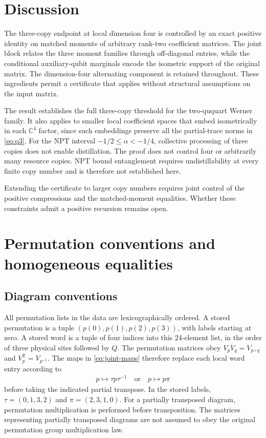 \documentclass[aps,pra,reprint,superscriptaddress,amsmath,amssymb,floatfix,nofootinbib]{revtex4-2}
\newcommand{\C}{\mathbb C}
\begin{document}
\section{Discussion}
\label{sec:discussion}

The three-copy endpoint at local dimension four is controlled by an
exact positive identity on matched moments of arbitrary rank-two
coefficient matrices. The joint block relates the three moment families
through off-diagonal entries, while the conditional auxiliary-qubit
marginals encode the isometric support of the original matrix.
The dimension-four alternating component is retained throughout.
These ingredients permit a certificate that applies without structural
assumptions on the input matrix.

The result establishes the full three-copy threshold for the two-ququart
Werner family. It also applies to smaller local coefficient spaces that
embed isometrically in each $\C^4$ factor, since such embeddings preserve
all the partial-trace norms in \cref{eq:q3}.
For the NPT interval $-1/2\leq\alpha<-1/4$, collective processing of
three copies does not enable distillation.
The proof does not control four or arbitrarily many resource copies.
NPT bound entanglement requires undistillability at every finite copy
number and is therefore not established here.

Extending the certificate to larger copy numbers requires joint
control of the positive compressions and the matched-moment equalities.
Whether these constraints admit a positive recursion remains open.

\appendix

\section{Permutation conventions and homogeneous equalities}
\label{app:equalities}

\subsection{Diagram conventions}

All permutation lists in the data are lexicographically ordered.
A stored permutation is a tuple $(p(0),p(1),p(2),p(3))$, with labels
starting at zero. A stored word is a tuple of four indices into this
24-element list, in the order of three physical sites followed by $Q$.
The permutation matrices obey $V_pV_q=V_{p\circ q}$ and
$V_p^{\mathsf T}=V_{p^{-1}}$.
The maps in \cref{eq:joint-maps} therefore replace each local word entry
according to
\begin{align}
 p\longmapsto\tau p\tau^{-1}
 \quad\text{or}\quad p\longmapsto p\pi
 \label{eq:joint-word-maps}
\end{align}
before taking the indicated partial transpose.
In the stored labels, $\tau=(0,1,3,2)$ and $\pi=(2,3,1,0)$.
For a partially transposed diagram, permutation multiplication is
performed before transposition. The matrices representing partially
transposed diagrams are not assumed to obey the original permutation
group multiplication law.
\end{document}
